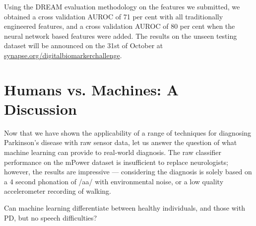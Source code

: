 \documentclass[12pt, twoside]{book}
\begin{document}
Using the DREAM evaluation methodology on the features we submitted, we obtained a cross validation AUROC of 71 per cent with all traditionally engineered features, and a cross validation AUROC of 80 per cent when the neural network based features were added. The results on the unseen testing dataset will be announced on the 31st of October at \url{synapse.org/digitalbiomarkerchallenge}. 









\newpage
\section{Humans vs. Machines: A Discussion}
\label{powerml}
Now that we have shown the applicability of a range of techniques for diagnosing Parkinson's disease with raw sensor data, let us answer the question of what machine learning can provide to real-world diagnosis. The raw classifier performance on the mPower dataset is insufficient to replace neurologists; however, the results are impressive --- considering the diagnosis is solely based on a 4 second phonation of /aa/ with environmental noise, or a low quality accelerometer recording of walking.


\begin{highlight}
	Can machine learning differentiate between healthy individuals, and those with PD, but no speech difficulties?
\end{highlight}
\end{document}
